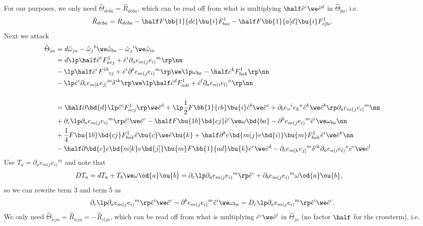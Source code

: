 For our purposes, we only need $\hat\Theta_{dcba}=\hat R_{dcba}$, which can be read off from what is multiplying $\half\hat e^c\we\hat e^d$ in $\hat\Theta_{ba}$, i.e.
\begin{equation}
\hat R_{dcba} = R_{dcba} - \half F\bb{1}{dc}\bu{i}F^1_{bai} - \half F\bb{1}{a[d}\bu{i}F^1_{c]bi}. 
\end{equation}
%
Next we attack
\begin{align}
\hat\Theta_{ja} &= d\hat\omega_{ja} - \hat\omega{_j}^b\we\hat\omega_{ba} - \hat\omega{_j}^i\we\hat\omega_{ia} \nonumber\\
& = d\lp\half \hat e^cF^1_{acj} + \hat e^i\partial_a e_{m(j}e{_{i)}}^m\rp\nn\\
& - \lp\half \hat e^cF{^{1b}}_{cj} + \hat e^i\partial^b e_{m(j}e{_{i)}}^m\rp\we\lp\omega_{ba} - \half\hat e^kF^1_{bak}\rp\nn\\
& - \lp \hat e^c\partial_c e_{m[k} e{_{j]}}^m\delta^{ik} \rp\we\lp \half \hat e^dF^1_{adi} + \hat e^l\partial_a e_{n(i}e{_{l)}}^n \rp\nn\\
\intertext{}
& = \half \partial\bd{d}\lp\hat e^cF^1_{acj}\rp\we\hat e^d + \lp\frac{1}{2}F\bb{1}{cb}\bu{i}\hat e^b\we\hat e^c + \partial_be{_n}^i e{_k}^n\hat e^k\we\hat e^b\rp\partial_a e_{m(j}e{_{i)}}^m\nn\\
& + \partial_c\lp\partial_a e_{m(j}e{_{i)}}^m\rp\hat e^i \we\hat e^c - \half F\bu{1b}\bd{cj}\hat e^c\we\omega\bd{ba} - \partial^b e_{m(j}e{_{i)}}^m\hat e^i\we\omega_{ba}\nn\\
& + \frac{1}{4}F\bu{1b}\bd{cj}F^1_{bak}\hat e\bu{c}\we\hat e\bu{k} + \half\partial^b e\bd{m(j}e\bd{i)}\bu{m}F^1_{bak}\hat e^i\we\hat e^k\nn\\
& - \half\partial\bd{c} e\bd{m[k} e\bd{j]}\bu{m}F\bb{1}{ad}\bu{k}\hat e^c\we \hat e^d - \partial_c e_{m[k} e{_{j]}}^m\delta^{ik} \partial_a e_{n(i}e{_{l)}}^n\hat e^c\we \hat e^l
\end{align}
%
Use $T_a = \partial_a e_{m(j}e{_{i)}}^m$ and note that 
\begin{align}
DT_a = dT_a + T_b\we\omega\od{a}\ou{b} = \partial_c&\lp\partial_a e_{m(j}e{_{i)}}^m\rp\hat e^c + \partial_b e_{m(j}e{_{i)}}^m\omega\od{a}\ou{b},
\end{align}
so we can rewrite term 3 and term 5 as
\begin{equation}
\partial_c\lp\partial_a e_{m(j}e{_{i)}}^m\rp\hat e^i \we\hat e^c - \partial^b e_{m(j}e{_{i)}}^m\hat e^i\we\omega_{ba} = D_c\lp\partial_a e_{m(j}e{_{i)}}^m\rp\hat e^i \we\hat e^c. 
\end{equation}
%
We only need $\hat\Theta_{lcja}=\hat R_{lcja}=-\hat R_{clja}$, which can be read off from what is multiplying $\hat e^c\we\hat e^l$ in $\hat\Theta_{ja}$ (no factor $\half$ for the crossterm), i.e.

